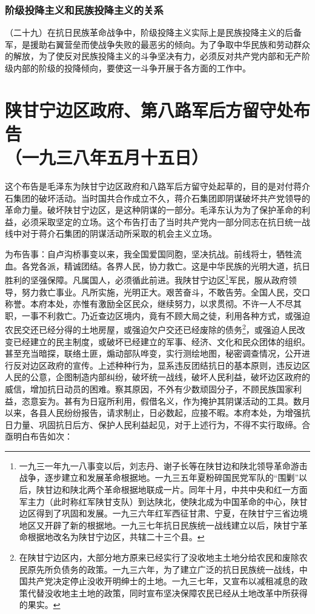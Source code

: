 \documentclass[cn,11pt,chinese]{elegantbook}
\def\myformat#1{\hfil\hfil #1}
\begin{document}
\subsubsection*{\myformat{阶级投降主义和民族投降主义的关系}}
（二十九）在抗日民族革命战争中，阶级投降主义实际上是民族投降主义的后备军，是援助右翼营垒而使战争失败的最恶劣的倾向。为了争取中华民族和劳动群众的解放，为了使反对民族投降主义的斗争坚决有力，必须反对共产党内部和无产阶级内部的阶级的投降倾向，要使这一斗争开展于各方面的工作中。\\
\newpage\section*{\myformat{陕甘宁边区政府、第八路军后方留守处布告}\\\myformat{（一九三八年五月十五日）}}
\begin{introduction}\item  这个布告是毛泽东为陕甘宁边区政府和八路军后方留守处起草的，目的是对付蒋介石集团的破坏活动。当时国共合作成立不久，蒋介石集团即阴谋破坏共产党领导的革命力量。破坏陕甘宁边区，是这种阴谋的一部分。毛泽东认为为了保护革命的利益，必须采取坚定的立场。这个布告打击了当时共产党内一部分同志在抗日统一战线中对于蒋介石集团的阴谋活动所采取的机会主义立场。\end{introduction}
为布告事：自卢沟桥事变以来，我全国爱国同胞，坚决抗战。前线将士，牺牲流血。各党各派，精诚团结。各界人民，协力救亡。这是中华民族的光明大道，抗日胜利的坚强保障。凡属国人，必须循此前进。我陕甘宁边区\footnote[1]{ 一九三一年九一八事变以后，刘志丹、谢子长等在陕甘边和陕北领导革命游击战争，逐步建立和发展革命根据地。一九三五年夏粉碎国民党军队的“围剿”以后，陕甘边和陕北两个革命根据地联成一片。同年十月，中共中央和红一方面军主力（此时称红军陕甘支队）到达陕北，使陕北成为中国革命的中心，陕甘边区得到了巩固和发展。一九三六年红军西征甘肃、宁夏，在陕甘宁三省边境地区又开辟了新的根据地。一九三七年抗日民族统一战线建立以后，陕甘宁革命根据地改名为陕甘宁边区，共辖二十三个县。}军民，服从政府领导，努力救亡事业。凡所实施，光明正大。艰苦奋斗，不敢告劳。全国人民，交口称誉。本府本处，亦惟有激励全区民众，继续努力，以求贯彻。不许一人不尽其职，一事不利救亡。乃近查边区境内，竟有不顾大局之徒，利用各种方式，或强迫农民交还已经分得的土地房屋，或强迫欠户交还已经废除的债务\footnote[2]{ 在陕甘宁边区内，大部分地方原来已经实行了没收地主土地分给农民和废除农民原先所负债务的政策。一九三六年，为了建立广泛的抗日民族统一战线，中国共产党决定停止没收开明绅士的土地。一九三七年，又宣布以减租减息的政策代替没收地主土地的政策，同时宣布坚决保障农民已经从土地改革中所获得的果实。}，或强迫人民改变已经建立的民主制度，或破坏已经建立的军事、经济、文化和民众团体的组织。甚至充当暗探，联络土匪，煽动部队哗变，实行测绘地图，秘密调查情况，公开进行反对边区政府的宣传。上述种种行为，显系违反团结抗日的基本原则，违反边区人民的公意，企图制造内部纠纷，破坏统一战线，破坏人民利益，破坏边区政府的威信，增加抗日动员的困难。察其原因，不外有少数顽固分子，不顾民族国家利益，恣意妄为。甚有为日寇所利用，假借名义，作为掩护其阴谋活动的工具。数月以来，各县人民纷纷报告，请求制止，日必数起，应接不暇。本府本处，为增强抗日力量、巩固抗日后方、保护人民利益起见，对于上述行为，不得不实行取缔。合亟明白布告如次：\\
\end{document}
